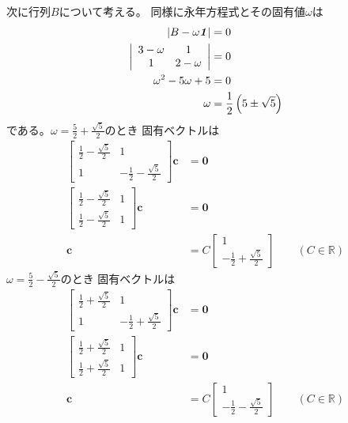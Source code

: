 次に行列$B$について考える。
同様に永年方程式とその固有値$\omega$は
\begin{align}
	|B-\omega\identity|
&=
	0 \\
%
%
	\left|
	\begin{array}{cc}
		3-\omega & 1 \\
		1 & 2-\omega
	\end{array}
	\right|
&=
	0 \\
%
%
	\omega^2
	-
	5\omega
	+
	5
&=
	0 \\
%
%
	\omega
&=
	\frac{1}{2}
		\left(
			5
			\pm
			\sqrt{5}
		\right)
\end{align}
である。$\omega=\frac{5}{2}+\frac{\sqrt{5}}{2}$のとき
固有ベクトルは
\begin{align}
	\left[
	\begin{array}{cc}
		\frac{1}{2}-\frac{\sqrt{5}}{2} & 1 \\
		1 & -\frac{1}{2}-\frac{\sqrt{5}}{2}
	\end{array}
	\right]
		\bm{c}
&=
	\bm{0} \\
%
%
	\left[
	\begin{array}{cc}
		\frac{1}{2}-\frac{\sqrt{5}}{2} & 1 \\
		\frac{1}{2}-\frac{\sqrt{5}}{2} & 1
	\end{array}
	\right]
		\bm{c}
&=
	\bm{0} \\
%
%
	\bm{c}
&=
	C
		\left[
		\begin{array}{c}
			1 \\ -\frac{1}{2}+\frac{\sqrt{5}}{2}
		\end{array}
		\right]
	\qquad
	(C\in\mathbb{R})
\end{align}
$\omega=\frac{5}{2}-\frac{\sqrt{5}}{2}$のとき
固有ベクトルは
\begin{align}
	\left[
	\begin{array}{cc}
		\frac{1}{2}+\frac{\sqrt{5}}{2} & 1 \\
		1 & -\frac{1}{2}+\frac{\sqrt{5}}{2}
	\end{array}
	\right]
		\bm{c}
&=
	\bm{0} \\
%
%
	\left[
	\begin{array}{cc}
		\frac{1}{2}+\frac{\sqrt{5}}{2} & 1 \\
		\frac{1}{2}+\frac{\sqrt{5}}{2} & 1
	\end{array}
	\right]
		\bm{c}
&=
	\bm{0} \\
%
%
	\bm{c}
&=
	C
		\left[
		\begin{array}{c}
			1 \\ -\frac{1}{2}-\frac{\sqrt{5}}{2}
		\end{array}
		\right]
	\qquad
	(C\in\mathbb{R})
\end{align}

